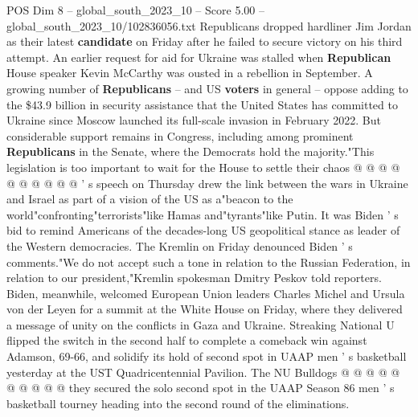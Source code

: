 \begin{textsample}{POS Dim 8 – global\_south\_2023\_10 – Score 5.00 – global\_south\_2023\_10/102836056.txt}
Republicans dropped hardliner Jim Jordan as their latest \textbf{candidate} on Friday after he failed to secure victory on his third attempt.
An earlier request for aid for Ukraine was stalled when \textbf{Republican} House speaker Kevin McCarthy was ousted in a rebellion in September.
A growing number of \textbf{Republicans} -- and US \textbf{voters} in general -- oppose adding to the \$43.9 billion in security assistance that the United States has committed to Ukraine since Moscow launched its full-scale invasion in February 2022.
But considerable support remains in Congress, including among prominent \textbf{Republicans} in the Senate, where the Democrats hold the majority."This legislation is too important to wait for the House to settle their chaos @ @ @ @ @ @ @ @ @ @ ' s speech on Thursday drew the link between the wars in Ukraine and Israel as part of a vision of the US as a"beacon to the world"confronting"terrorists"like Hamas and"tyrants"like Putin.
It was Biden ' s bid to remind Americans of the decades-long US geopolitical stance as leader of the Western democracies.
The Kremlin on Friday denounced Biden ' s comments."We do not accept such a tone in relation to the Russian Federation, in relation to our president,"Kremlin spokesman Dmitry Peskov told reporters.
Biden, meanwhile, welcomed European Union leaders Charles Michel and Ursula von der Leyen for a summit at the White House on Friday, where they delivered a message of unity on the conflicts in Gaza and Ukraine.
Streaking National U flipped the switch in the second half to complete a comeback win against Adamson, 69-66, and solidify its hold of second spot in UAAP men ' s basketball yesterday at the UST Quadricentennial Pavilion.
The NU Bulldogs @ @ @ @ @ @ @ @ @ @ they secured the solo second spot in the UAAP Season 86 men ' s basketball tourney heading into the second round of the eliminations.

\end{textsample}
